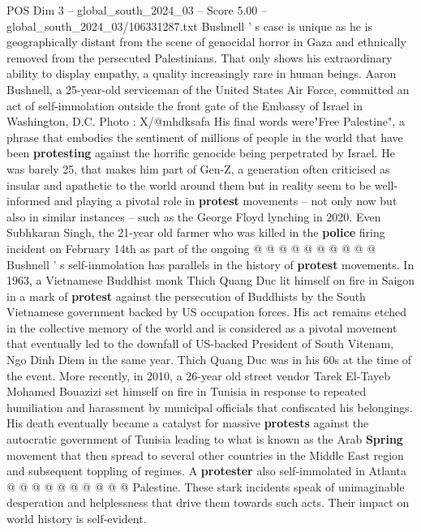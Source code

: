 \begin{textsample}{POS Dim 3 – global\_south\_2024\_03 – Score 5.00 – global\_south\_2024\_03/106331287.txt}  \label{ex:f3_pos_427}
Bushnell ' s case is unique as he is geographically distant from the scene of genocidal horror in Gaza and ethnically removed from the persecuted Palestinians.
That only shows his extraordinary ability to display empathy, a quality increasingly rare in human beings.
Aaron Bushnell, a 25-year-old serviceman of the United States Air Force, committed an act of self-immolation outside the front gate of the Embassy of Israel in Washington, D.C.
Photo : X/@mhdksafa His final words were"Free Palestine", a phrase that embodies the sentiment of millions of people in the world that have been \textbf{protesting} against the horrific genocide being perpetrated by Israel.
He was barely 25, that makes him part of Gen-Z, a generation often criticised as insular and apathetic to the world around them but in reality seem to be well-informed and playing a pivotal role in \textbf{protest} movements -- not only now but also in similar instances -- such as the George Floyd lynching in 2020.
Even Subhkaran Singh, the 21-year old farmer who was killed in the \textbf{police} firing incident on February 14th as part of the ongoing @ @ @ @ @ @ @ @ @ @ Bushnell ' s self-immolation has parallels in the history of \textbf{protest} movements.
In 1963, a Vietnamese Buddhist monk Thich Quang Duc lit himself on fire in Saigon in a mark of \textbf{protest} against the persecution of Buddhists by the South Vietnamese government backed by US occupation forces.
His act remains etched in the collective memory of the world and is considered as a pivotal movement that eventually led to the downfall of US-backed President of South Vitenam, Ngo Dinh Diem in the same year.
Thich Quang Duc was in his 60s at the time of the event.
More recently, in 2010, a 26-year old street vendor Tarek El-Tayeb Mohamed Bouazizi set himself on fire in Tunisia in response to repeated humiliation and harassment by municipal officials that confiscated his belongings.
His death eventually became a catalyst for massive \textbf{protests} against the autocratic government of Tunisia leading to what is known as the Arab \textbf{Spring} movement that then spread to several other countries in the Middle East region and subsequent toppling of regimes.
A \textbf{protester} also self-immolated in Atlanta @ @ @ @ @ @ @ @ @ @ Palestine.
These stark incidents speak of unimaginable desperation and helplessness that drive them towards such acts.
Their impact on world history is self-evident.

\end{textsample}
